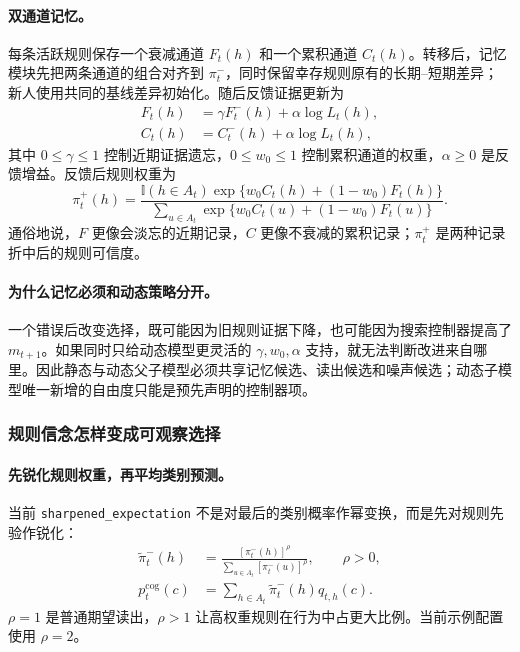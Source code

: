 \paragraph{双通道记忆。}
每条活跃规则保存一个衰减通道 $F_t(h)$ 和一个累积通道 $C_t(h)$。转移后，记忆模块先把两条通道的组合对齐到 $\pi^-_t$，同时保留幸存规则原有的长期--短期差异；新人使用共同的基线差异初始化。随后反馈证据更新为
\begin{align}
F_t(h)
&=\gamma F^-_t(h)+\alpha\log L_t(h),
\nonumber\\
C_t(h)
&=C^-_t(h)+\alpha\log L_t(h),
\label{eq:model0809-dual-memory}
\end{align}
其中 $0\leq\gamma\leq1$ 控制近期证据遗忘，$0\leq w_0\leq1$ 控制累积通道的权重，$\alpha\geq0$ 是反馈增益。反馈后规则权重为
\begin{equation}
\pi^+_t(h)
=\frac{\mathbb I(h\in A_t)
\exp\{w_0C_t(h)+(1-w_0)F_t(h)\}}
{\sum_{u\in A_t}
\exp\{w_0C_t(u)+(1-w_0)F_t(u)\}}.
\label{eq:model0809-posterior}
\end{equation}
通俗地说，$F$ 更像会淡忘的近期记录，$C$ 更像不衰减的累积记录；$\pi^+_t$ 是两种记录折中后的规则可信度。

\paragraph{为什么记忆必须和动态策略分开。}
一个错误后改变选择，既可能因为旧规则证据下降，也可能因为搜索控制器提高了 $m_{t+1}$。如果同时只给动态模型更灵活的 $\gamma,w_0,\alpha$ 支持，就无法判断改进来自哪里。因此静态与动态父子模型必须共享记忆候选、读出候选和噪声候选；动态子模型唯一新增的自由度只能是预先声明的控制器项。


\subsubsection{规则信念怎样变成可观察选择}

\paragraph{先锐化规则权重，再平均类别预测。}
当前 \texttt{sharpened\_expectation} 不是对最后的类别概率作幂变换，而是先对规则先验作锐化：
\begin{align}
\widetilde\pi^-_t(h)
&=\frac{[\pi^-_t(h)]^{\rho}}
{\sum_{u\in A_t}[\pi^-_t(u)]^{\rho}},
\qquad \rho>0,
\nonumber\\
p^{\mathrm{cog}}_t(c)
&=\sum_{h\in A_t}\widetilde\pi^-_t(h)q_{t,h}(c).
\label{eq:model0809-choice-expectation}
\end{align}
$\rho=1$ 是普通期望读出，$\rho>1$ 让高权重规则在行为中占更大比例。当前示例配置使用 $\rho=2$。

